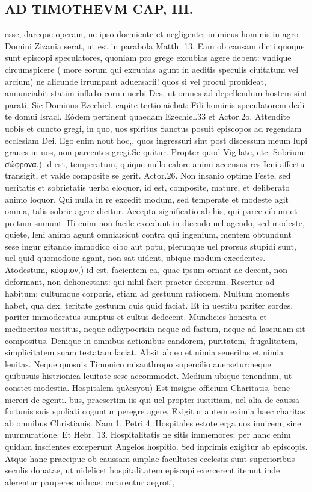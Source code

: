 \documentclass{article}
\begin{document}
\begin{pages}
\section*{AD TIMOTHEVM CAP, III. }
\marginpar{[ p.77 ]}\pstart esse, dareque operam, ne ipso dormiente et negligente, inimicus hominis in agro Domini Zizania serat, ut est in parabola Matth. 13. Eam ob causam dicti quoque sunt episcopi speculatores, quoniam pro grege excubias agere debent: vndique circumspicere ( more eorum qui excubias agunt in aeditis speculis ciuitatum vel arcium) ne alicunde irrumpant aduersarii! quos si vel procul prouideat, annunciabit statim infla1o cornu uerbi Des, ut omnes ad depellendum hostem sint parati. Sic Dominus Ezechiel. capite tertio aiebat: Fili hominis speculatorem dedi te domui lsracl. Eódem pertinent quaedam Ezechiel.33 et Actor.2o. Attendite uobis et cuncto gregi, in quo, uos spiritus Sanctus posuit episcopos ad regendam ecclesiam Dei. Ego enim nout hoc,, quos ingressuri sint post discessum meum lupi graues in uos, non parcentes gregi.Se quitur. Propter quod Vigilate, etc.  \pend\pstart Sobrium: σώφρονα.) id est, temperatum, quique nullo calore animi accensus res Ieni affectu transigit, et valde composite se gerit. Actor.26. Non insanio optime Feste, sed ueritatis et sobrietatis uerba eloquor, id est, composite, mature, et deliberato animo loquor. Qui nulla in re excedit modum, sed temperate et modeste agit omnia, talis sobrie agere dicitur. Accepta significatio ab his, qui parce cibum et po tum sumunt. Hi enim non facile excedunt in dicendo uel agendo, sed modeste, quiete, leni animo agunt omnia:sicut contra qui ingenium, mentem obtundunt sese ingur gitando immodico cibo aut potu, plerunque uel prorsus stupidi sunt, uel quid quomodoue agant, non sat uident, ubique modum excedentes.  \pend\pstart Atodestum, κόσμιον,) id est, facientem ea, quae ipsum ornant ac decent, non deformant, non dehonestant: qui nihil facit praeter decorum. Resertur ad habitum: cultumque corporis, etiam ad gestuum rationem. Multum moments habet, qua dex. teritate gestuum quis quid faciat. Et in uestitu pariter sordes, pariter immoderatus sumptus et cultus dedecent. Mundicies honesta et mediocritas uestitus, neque adhypocrisin neque ad fastum, neque ad lasciuiam sit compositus. Denique in omnibus actionibus candorem, puritatem, frugalitatem, simplicitatem suam testatam faciat. Absit ab eo et nimia seueritas et nimia leuitas. Neque quosuis Timonico misanthropo supercilio auersetur:neque quibusuis histrionica leuitate sese accommodet. Medium ubique tenendum, ut constet modestia.  \pend\pstart Hospitalem quλesyou) Est insigne officium Charitatis, bene mereri de egenti. bus, praesertim iis qui uel propter iustitiam, uel alia de caussa fortunis suis spoliati coguntur peregre agere, Exigitur autem eximia haec charitas ab omnibus Christianis. Nam 1. Petri 4. Hospitales estote erga uos inuicem, sine murmuratione. Et Hebr. 13. Hospitalitatis ne sitis immemores: per hanc enim quidam inscientes exceperunt Angelos hospitio. Sed inprimis exigitur ab episcopis. Atque hanc praecipue ob caussam amplae facultates ecclesiis sunt superioribus seculis donatae, ut uidelicet hospitalitatem episcopi exercerent itemut inde alerentur pauperes uiduae, curarentur aegroti, 
\end{pages}
\end{document}
